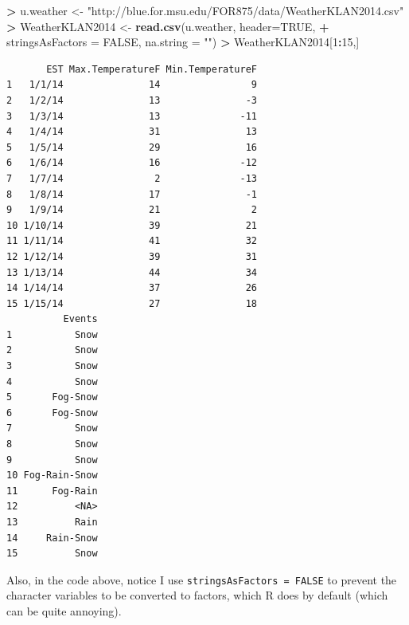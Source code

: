 \documentclass[]{krantz}
\makeatletter
\newenvironment{Shaded}{\begin{snugshade}}{\end{snugshade}}
\newcommand{\KeywordTok}[1]{\textcolor[rgb]{0.27,0.27,0.27}{\textbf{#1}}}
\newcommand{\DataTypeTok}[1]{\textcolor[rgb]{0.27,0.27,0.27}{#1}}
\newcommand{\DecValTok}[1]{\textcolor[rgb]{0.06,0.06,0.06}{#1}}
\newcommand{\StringTok}[1]{\textcolor[rgb]{0.5,0.5,0.5}{#1}}
\newcommand{\OtherTok}[1]{\textcolor[rgb]{0.37,0.37,0.37}{#1}}
\newcommand{\OperatorTok}[1]{\textcolor[rgb]{0.43,0.43,0.43}{\textbf{#1}}}
\newcommand{\NormalTok}[1]{#1}
\newenvironment{kframe}{%
\medskip{}
\setlength{\fboxsep}{.8em}
 \def\at@end@of@kframe{}%
 \ifinner\ifhmode%
  \def\at@end@of@kframe{\end{minipage}}%
  \begin{minipage}{\columnwidth}%
 \fi\fi%
 \def\FrameCommand##1{\hskip\@totalleftmargin \hskip-\fboxsep
 \colorbox{shadecolor}{##1}\hskip-\fboxsep
     \hskip-\linewidth \hskip-\@totalleftmargin \hskip\columnwidth}%
 \MakeFramed {\advance\hsize-\width
   \@totalleftmargin\z@ \linewidth\hsize
   \@setminipage}}%
 {\par\unskip\endMakeFramed%
 \at@end@of@kframe}
\renewenvironment{Shaded}{\begin{kframe}}{\end{kframe}}
\theoremstyle{definition}
\theoremstyle{definition}
\theoremstyle{definition}
\theoremstyle{remark}
\makeatother
\begin{document}
\begin{Shaded}
\begin{Highlighting}[]
\OperatorTok{>}\StringTok{ }\NormalTok{u.weather <-}\StringTok{ "http://blue.for.msu.edu/FOR875/data/WeatherKLAN2014.csv"}
\OperatorTok{>}\StringTok{ }\NormalTok{WeatherKLAN2014 <-}\StringTok{ }\KeywordTok{read.csv}\NormalTok{(u.weather, }\DataTypeTok{header=}\OtherTok{TRUE}\NormalTok{, }
\OperatorTok{+}\StringTok{                             }\DataTypeTok{stringsAsFactors =} \OtherTok{FALSE}\NormalTok{, }\DataTypeTok{na.string =} \StringTok{""}\NormalTok{)}
\OperatorTok{>}\StringTok{ }\NormalTok{WeatherKLAN2014[}\DecValTok{1}\OperatorTok{:}\DecValTok{15}\NormalTok{,]}
\end{Highlighting}
\end{Shaded}

\begin{verbatim}
       EST Max.TemperatureF Min.TemperatureF
1   1/1/14               14                9
2   1/2/14               13               -3
3   1/3/14               13              -11
4   1/4/14               31               13
5   1/5/14               29               16
6   1/6/14               16              -12
7   1/7/14                2              -13
8   1/8/14               17               -1
9   1/9/14               21                2
10 1/10/14               39               21
11 1/11/14               41               32
12 1/12/14               39               31
13 1/13/14               44               34
14 1/14/14               37               26
15 1/15/14               27               18
          Events
1           Snow
2           Snow
3           Snow
4           Snow
5       Fog-Snow
6       Fog-Snow
7           Snow
8           Snow
9           Snow
10 Fog-Rain-Snow
11      Fog-Rain
12          <NA>
13          Rain
14     Rain-Snow
15          Snow
\end{verbatim}

Also, in the code above, notice I use
\texttt{stringsAsFactors\ =\ FALSE} to prevent the character variables
to be converted to factors, which R does by default (which can be quite
annoying).



\backmatter
\printindex
\end{document}
